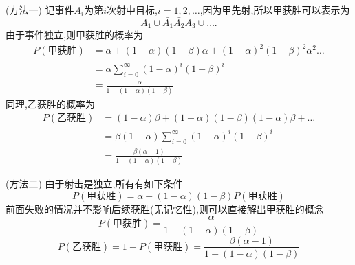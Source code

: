 \documentclass[12pt, a4paper, oneside, UTF8]{ctexbook}
\begin{document}
    \begin{solution}
        \item [(方法一)]
        记事件$A_i$为第$i$次射中目标,$i=1,2,\ldots$,因为甲先射,所以甲获胜可以表示为 
        \[
        A_1\cup\bar{A_1}\bar{A_2}A_3\cup\ldots.
        \]
        由于事件独立,则甲获胜的概率为
        \begin{align*}
        P(\text{甲获胜}) 
        &= \alpha + (1-\alpha)(1-\beta)\alpha + (1-\alpha)^2(1-\beta)^2\alpha^2\ldots \\ 
        &= \alpha \sum_{i=0}^{\infty}(1-\alpha)^{i}(1-\beta)^i \\
        &= \frac{\alpha}{1- (1-\alpha)(1-\beta)}
        \end{align*}
        同理,乙获胜的概率为
        \begin{align*}
        P(\text{乙获胜}) 
        &= (1-\alpha)\beta + (1-\alpha)(1-\beta)(1-\alpha)\beta+\ldots \\ 
        &= \beta(1-\alpha)\sum_{i=0}^{\infty}(1-\alpha)^i(1-\beta)^i \\
        &= \frac{\beta(\alpha-1)}{1- (1-\alpha)(1-\beta)}
        \end{align*}
        \item [(方法二)]
        由于射击是独立,所有有如下条件
        \[
        P(\text{甲获胜})=\alpha + (1-\alpha)(1-\beta)P(\text{甲获胜}) 
        \]
        前面失败的情况并不影响后续获胜(无记忆性),则可以直接解出甲获胜的概念
        \[
        P(\text{甲获胜})= \frac{\alpha}{1- (1-\alpha)(1-\beta)}
        \]
        \[
        P(\text{乙获胜}) = 1 - P(\text{甲获胜}) = \frac{\beta(\alpha-1)}{1- (1-\alpha)(1-\beta)}
        \]
    \end{solution}
\ifx\allfiles\undefined
\end{document}
